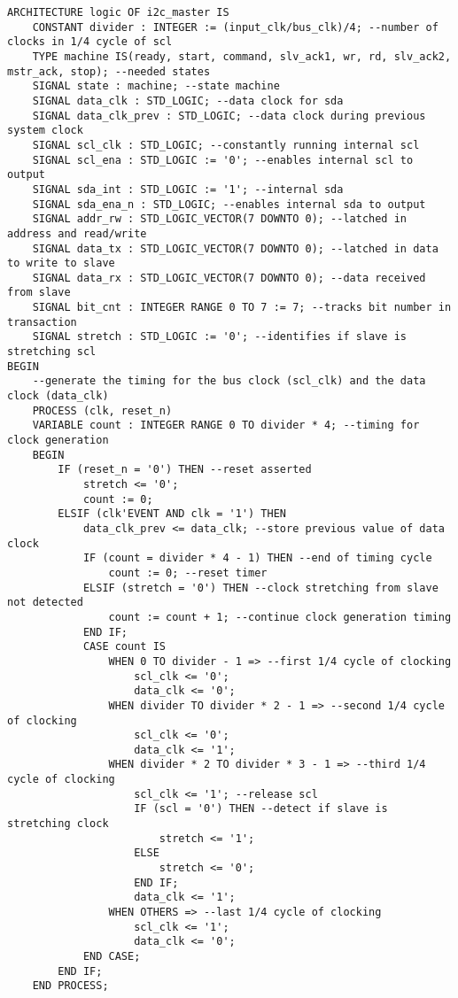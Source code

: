 \begin{lstlisting}
ARCHITECTURE logic OF i2c_master IS
    CONSTANT divider : INTEGER := (input_clk/bus_clk)/4; --number of clocks in 1/4 cycle of scl
    TYPE machine IS(ready, start, command, slv_ack1, wr, rd, slv_ack2, mstr_ack, stop); --needed states
    SIGNAL state : machine; --state machine
    SIGNAL data_clk : STD_LOGIC; --data clock for sda
    SIGNAL data_clk_prev : STD_LOGIC; --data clock during previous system clock
    SIGNAL scl_clk : STD_LOGIC; --constantly running internal scl
    SIGNAL scl_ena : STD_LOGIC := '0'; --enables internal scl to output
    SIGNAL sda_int : STD_LOGIC := '1'; --internal sda
    SIGNAL sda_ena_n : STD_LOGIC; --enables internal sda to output
    SIGNAL addr_rw : STD_LOGIC_VECTOR(7 DOWNTO 0); --latched in address and read/write
    SIGNAL data_tx : STD_LOGIC_VECTOR(7 DOWNTO 0); --latched in data to write to slave
    SIGNAL data_rx : STD_LOGIC_VECTOR(7 DOWNTO 0); --data received from slave
    SIGNAL bit_cnt : INTEGER RANGE 0 TO 7 := 7; --tracks bit number in transaction
    SIGNAL stretch : STD_LOGIC := '0'; --identifies if slave is stretching scl
BEGIN
    --generate the timing for the bus clock (scl_clk) and the data clock (data_clk)
    PROCESS (clk, reset_n)
    VARIABLE count : INTEGER RANGE 0 TO divider * 4; --timing for clock generation
    BEGIN
        IF (reset_n = '0') THEN --reset asserted
            stretch <= '0';
            count := 0;
        ELSIF (clk'EVENT AND clk = '1') THEN
            data_clk_prev <= data_clk; --store previous value of data clock
            IF (count = divider * 4 - 1) THEN --end of timing cycle
                count := 0; --reset timer
            ELSIF (stretch = '0') THEN --clock stretching from slave not detected
                count := count + 1; --continue clock generation timing
            END IF;
            CASE count IS
                WHEN 0 TO divider - 1 => --first 1/4 cycle of clocking
                    scl_clk <= '0';
                    data_clk <= '0';
                WHEN divider TO divider * 2 - 1 => --second 1/4 cycle of clocking
                    scl_clk <= '0';
                    data_clk <= '1';
                WHEN divider * 2 TO divider * 3 - 1 => --third 1/4 cycle of clocking
                    scl_clk <= '1'; --release scl
                    IF (scl = '0') THEN --detect if slave is stretching clock
                        stretch <= '1';
                    ELSE
                        stretch <= '0';
                    END IF;
                    data_clk <= '1';
                WHEN OTHERS => --last 1/4 cycle of clocking
                    scl_clk <= '1';
                    data_clk <= '0';
            END CASE;
        END IF;
    END PROCESS;


\end{lstlisting}

